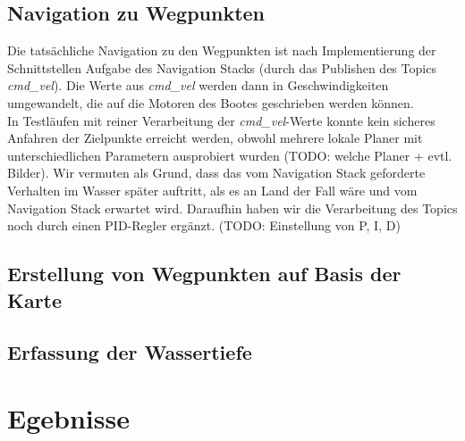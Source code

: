 \documentclass[conference]{IEEEtran}
\begin{document}
\subsection{Navigation zu Wegpunkten}
Die tatsächliche Navigation zu den Wegpunkten ist nach Implementierung der Schnittstellen Aufgabe des Navigation Stacks (durch das Publishen des Topics \textit{cmd\_vel}). Die Werte aus \textit{cmd\_vel} werden dann in Geschwindigkeiten umgewandelt, die auf die Motoren des Bootes geschrieben werden können.\\
In Testläufen mit reiner Verarbeitung der \textit{cmd\_vel}-Werte konnte kein sicheres Anfahren der Zielpunkte erreicht werden, obwohl mehrere lokale Planer mit unterschiedlichen Parametern ausprobiert wurden (TODO: welche Planer + evtl. Bilder). Wir vermuten als Grund, dass das vom Navigation Stack geforderte Verhalten im Wasser später auftritt, als es an Land der Fall wäre und vom Navigation Stack erwartet wird. Daraufhin haben wir die Verarbeitung des Topics noch durch einen PID-Regler ergänzt. (TODO: Einstellung von P, I, D)
\subsection{Erstellung von Wegpunkten auf Basis der Karte}
\subsection{Erfassung der Wassertiefe}

\section{Egebnisse}
\end{document}
